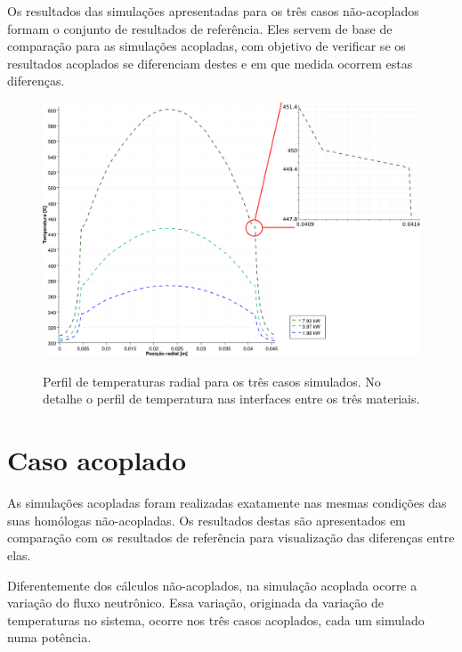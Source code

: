 Os resultados das simulações apresentadas para os três casos não-acoplados formam o conjunto de resultados
de referência. Eles servem de base de comparação para as simulações acopladas, com objetivo de verificar
se os resultados acoplados se diferenciam destes e em que medida ocorrem estas diferenças.

\begin{figure}[htb]
  \caption[Perfil de temperaturas radial para os três casos simulados.]
          {Perfil de temperaturas radial para os três casos simulados. No detalhe o perfil de temperatura nas interfaces entre os três materiais.}
  \centering\includegraphics[scale=0.5]{figuras/T_x_NC_square_port_detalhado.png}
  \label{fig:perf-t-nac-radial}
\end{figure}


\section{Caso acoplado}
\label{sec:cp}

As simulações acopladas foram realizadas exatamente nas mesmas condições das suas homólogas não-acopladas.
Os resultados destas são apresentados em comparação com os resultados de referência para visualização
das diferenças entre elas.

Diferentemente dos cálculos não-acoplados, na simulação acoplada ocorre a variação do fluxo neutrônico.
Essa variação, originada da variação de temperaturas no sistema, ocorre nos três casos acoplados, cada
um simulado numa potência.

